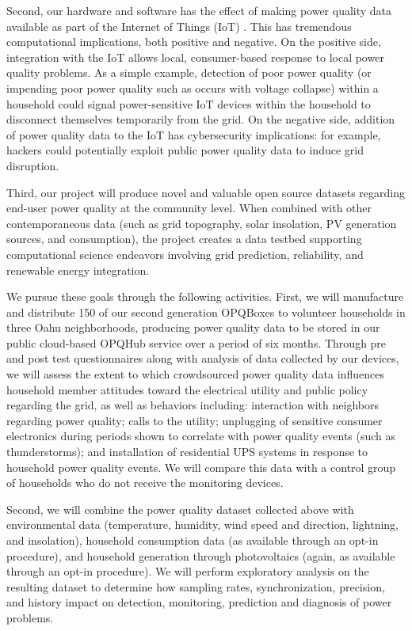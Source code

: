 Second, our hardware and software has the effect of making power quality data available as part of the Internet of Things (IoT) \cite{iot}. This has tremendous computational implications, both positive and negative.  On the positive side, integration with the IoT allows local, consumer-based response to local power quality problems. As a simple example, detection of poor power quality (or impending poor power quality such as occurs with voltage collapse) within a household could signal power-sensitive IoT devices within the household to disconnect themselves temporarily from the grid. On the negative side, addition of power quality data to the IoT has cybersecurity implications: for example, hackers could potentially exploit public power quality data to induce grid disruption.  

Third, our project will produce novel and valuable open source datasets regarding end-user power quality at the community level. When combined with other contemporaneous data (such as grid topography, solar insolation, PV generation sources, and consumption), the project creates a data testbed supporting computational science endeavors involving grid prediction, reliability, and renewable energy integration. 

We pursue these goals through the following activities. First, we will manufacture and distribute 150 of our second generation OPQBoxes to volunteer households in three Oahu neighborhoods, producing power quality data to be stored in our public cloud-based OPQHub service over a period of six months. Through pre and post test questionnaires along with analysis of data collected by our devices, we will assess the extent to which crowdsourced power quality data influences household member attitudes toward the electrical utility and public policy regarding the grid, as well as behaviors including: interaction with neighbors regarding power quality; calls to the utility; unplugging of sensitive consumer electronics during periods shown to correlate with power quality events (such as thunderstorms); and installation of residential UPS systems in response to household power quality events.  We will compare this data with a control group of households who do not receive the monitoring devices. 

Second, we will combine the power quality dataset collected above with environmental data (temperature, humidity, wind speed and direction, lightning, and insolation), household consumption data (as available through an opt-in procedure), and household generation through photovoltaics (again, as available through an opt-in procedure).  We will perform exploratory analysis on the resulting dataset to determine how sampling rates, synchronization, precision, and history impact on detection, monitoring, prediction and diagnosis of power problems.

